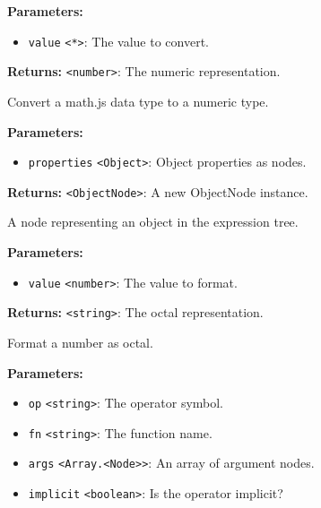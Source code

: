 \documentclass[12pt,a4paper]{article}
\begin{document}
\vspace{5mm}
\noindent {}


\noindent \textbf{Parameters:}
\begin{itemize}
  \item \texttt{value} \texttt{<*>}: The value to convert.
\end{itemize}

\noindent \textbf{Returns:} \texttt{<number>}: The numeric representation.

\noindent Convert a math.js data type to a numeric type.

\vspace{5mm}
\noindent {}


\noindent \textbf{Parameters:}
\begin{itemize}
  \item \texttt{properties} \texttt{<Object>}: Object properties as nodes.
\end{itemize}

\noindent \textbf{Returns:} \texttt{<ObjectNode>}: A new ObjectNode instance.

\noindent A node representing an object in the expression tree.

\vspace{5mm}
\noindent {}


\noindent \textbf{Parameters:}
\begin{itemize}
  \item \texttt{value} \texttt{<number>}: The value to format.
\end{itemize}

\noindent \textbf{Returns:} \texttt{<string>}: The octal representation.

\noindent Format a number as octal.

\vspace{5mm}
\noindent {}


\noindent \textbf{Parameters:}
\begin{itemize}
  \item \texttt{op} \texttt{<string>}: The operator symbol.
  \item \texttt{fn} \texttt{<string>}: The function name.
  \item \texttt{args} \texttt{<Array.<Node>>}: An array of argument nodes.
  \item \texttt{implicit} \texttt{<boolean>}: Is the operator implicit?
\end{itemize}
\end{document}
